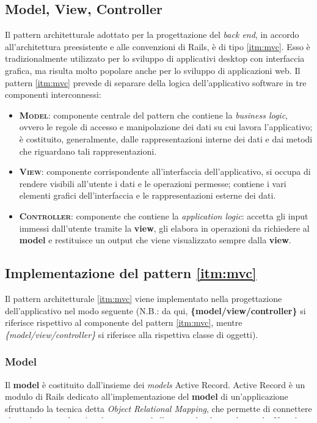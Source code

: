 \subsection{Model, View, Controller}
Il pattern architetturale adottato per la progettazione del \textit{back end}, in accordo all'architettura preesistente e alle convenzioni di Rails, è di tipo \ref{itm:mvc}. Esso è tradizionalmente utilizzato per lo sviluppo di applicativi desktop con interfaccia grafica, ma risulta molto popolare anche per lo sviluppo di applicazioni web. Il pattern \ref{itm:mvc} prevede di separare della logica dell'applicativo software in tre componenti interconnessi:
\begin{itemize}
    \item \textsc{\textbf{Model}}: componente centrale del pattern che contiene la \textit{business logic}, ovvero le regole di accesso e manipolazione dei dati su cui lavora l'applicativo; è costituito, generalmente, dalle rappresentazioni interne dei dati e dai metodi che riguardano tali rappresentazioni.
    \item \textsc{\textbf{View}}: componente corrispondente all'interfaccia dell'applicativo, si occupa di rendere visibili all'utente i dati e le operazioni permesse; contiene i vari elementi grafici dell'interfaccia e le rappresentazioni esterne dei dati.
    \item \textsc{\textbf{Controller}}: componente che contiene la \textit{application logic}: accetta gli input immessi dall'utente tramite la \textbf{view}, gli elabora in operazioni da richiedere al \textbf{model} e restituisce un output che viene visualizzato sempre dalla \textbf{view}.
\end{itemize}

\subsection{Implementazione del pattern \ref{itm:mvc}}
Il pattern architetturale \ref{itm:mvc} viene implementato nella progettazione dell'applicativo nel modo seguente (N.B.: da qui, \textbf{\{model/view/controller\}} si riferisce rispettivo al componente del pattern \ref{itm:mvc}, mentre \textit{\{model/view/controller\}} si riferisce alla rispettiva classe di oggetti).

\subsubsection{Model}
Il \textbf{model} è costituito dall'insieme dei \textit{models} Active Record. Active Record è un modulo di Rails dedicato all'implementazione del \textbf{model} di un'applicazione sfruttando la tecnica detta \textit{Object Relational Mapping}, che permette di connettere classi di oggetti di un'applicazione a tabelle in un database relazionale. Usando tale tecnica le proprietà e relazioni degli oggetti dell'applicazione possono essere conservate nel e lette dal database senza dover impiegare comandi SQL.

